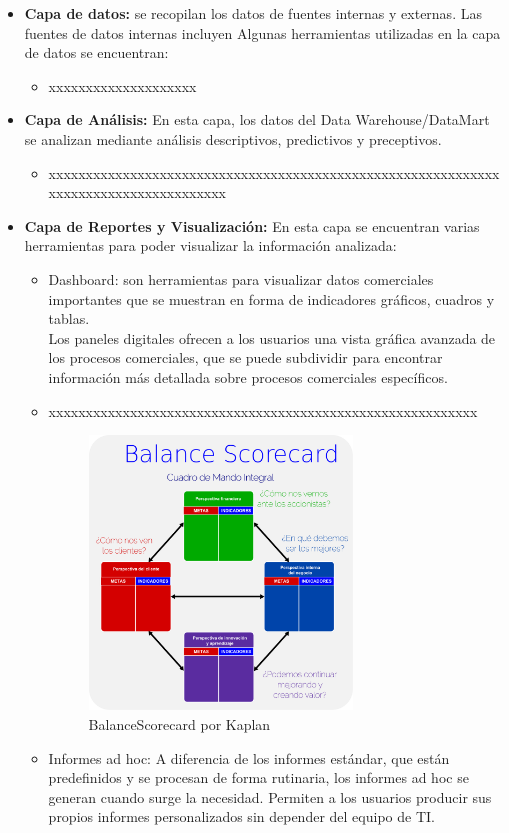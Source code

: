 \documentclass[preprint,12pt]{elsarticle}
\begin{document}
	\begin{itemize}
	\item \textbf{Capa de datos:} se recopilan los datos de fuentes internas y externas. Las fuentes de datos internas incluyen
	Algunas herramientas utilizadas en la capa de datos se encuentran:
		\begin{itemize}
		\item xxxxxxxxxxxxxxxxxxxx
		\end{itemize}

	\item \textbf{Capa de Análisis:} En esta capa, los datos del Data Warehouse/DataMart se analizan mediante análisis descriptivos, predictivos y preceptivos.
		\begin{itemize}
		\item xxxxxxxxxxxxxxxxxxxxxxxxxxxxxxxxxxxxxxxxxxxxxxxxxxxxxxxxxxxxxxxxxxxxxxxxxxxxxxxxxxxxx
		\end{itemize}

		\item \textbf{Capa de Reportes y Visualización:} En esta capa se encuentran varias herramientas para poder visualizar la información analizada:
		\begin{itemize}
		\item Dashboard: son herramientas para visualizar datos comerciales importantes que se muestran en forma de indicadores gráficos, cuadros y tablas. \\Los paneles digitales ofrecen a los usuarios una vista gráfica avanzada de los procesos comerciales, que se puede subdividir para encontrar información más detallada sobre procesos comerciales específicos.
		\item xxxxxxxxxxxxxxxxxxxxxxxxxxxxxxxxxxxxxxxxxxxxxxxxxxxxxxxxxx
\begin{figure}[htb]
	\begin{center}
		\includegraphics[width=7cm]{./IMAGENES/BalanceScorecard} 
		\caption{BalanceScorecard por Kaplan}
	\end{center}
\end{figure}

		\item Informes ad hoc: A diferencia de los informes estándar, que están predefinidos y se procesan de forma rutinaria, los informes ad hoc se generan cuando surge la necesidad. Permiten a los usuarios producir sus propios informes personalizados sin depender del equipo de TI.
		\end{itemize}

	\end{itemize}
\end{document}
